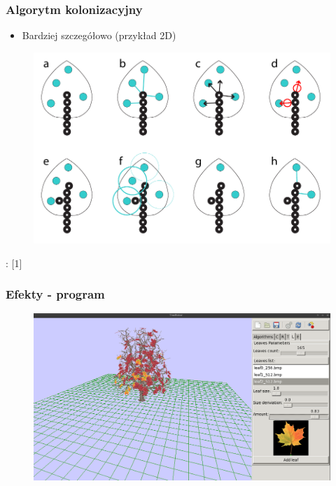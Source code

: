\documentclass[blue,table]{beamer}
\begin{document}
\begin{frame}\frametitle{Algorytm kolonizacyjny}
\begin{itemize}
\item{Bardziej szczegółowo (przykład 2D)}
\end{itemize}
\begin{figure}
\includegraphics[scale=0.35]{img/colonization/colonization_9.png} 
\end{figure}
\begin{footnotesize}
: [1]
\end{footnotesize}
\end{frame}

\begin{frame}\frametitle{Efekty - program}
\begin{figure}
\includegraphics[scale=0.35]{img/treemaker.png} 
\end{figure}
\end{frame}
\end{document}
